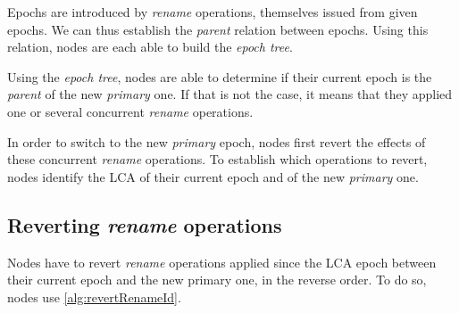 \documentclass[sigplan,10pt]{acmart}
\begin{document}
Epochs are introduced by \emph{rename} operations, themselves issued from given epochs.
We can thus establish the \emph{parent} relation between epochs.
Using this relation, nodes are each able to build the \emph{epoch tree}.

Using the \emph{epoch tree}, nodes are able to determine if their current epoch is the \emph{parent} of the new \emph{primary} one.
If that is not the case, it means that they applied one or several concurrent \emph{rename} operations.

In order to switch to the new \emph{primary} epoch, nodes first revert the effects of these concurrent \emph{rename} operations.
To establish which operations to revert, nodes identify the \ac{LCA} of their current epoch and of the new \emph{primary} one.

\subsection{Reverting \emph{rename} operations}
\label{sec:reverting-rename-op}

Nodes have to revert \emph{rename} operations applied since the \ac{LCA} epoch between their current epoch and the new primary one, in the reverse order.
To do so, nodes use \autoref{alg:revertRenameId}.
\end{document}
